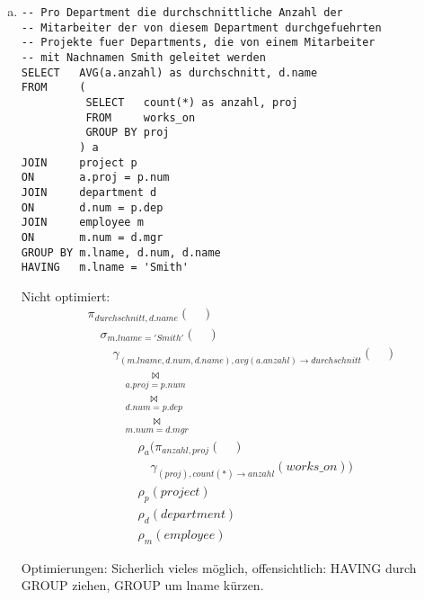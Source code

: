 \begin{normalText}
\begin{enumerate}[a)]
\item

	\begin{lstlisting}
-- Pro Department die durchschnittliche Anzahl der
-- Mitarbeiter der von diesem Department durchgefuehrten
-- Projekte fuer Departments, die von einem Mitarbeiter
-- mit Nachnamen Smith geleitet werden
SELECT   AVG(a.anzahl) as durchschnitt, d.name
FROM     (
          SELECT   count(*) as anzahl, proj
          FROM     works_on
          GROUP BY proj
         ) a
JOIN     project p
ON       a.proj = p.num
JOIN     department d
ON       d.num = p.dep
JOIN     employee m
ON       m.num = d.mgr
GROUP BY m.lname, d.num, d.name
HAVING   m.lname = 'Smith'
	\end{lstlisting}

\begin{note}
	Nicht optimiert:
	\begin{equation*}
\begin{split}
	 & \pi_{durchschnitt, d.name}( \quad )                                                     \\
	 & \quad \sigma_{m.lname = 'Smith'}(\quad)                                                 \\
	 & \qquad \gamma_{(m.lname, d.num, d.name), avg(a.anzahl) \rightarrow durchschnitt}(\quad) \\
	 & \qquad\quad \underset{a.proj = p.num}{\bowtie}                                          \\
	 & \qquad \quad  \underset{d.num = p.dep}{\bowtie}                                         \\
	 & \qquad \quad \underset{m.num = d.mgr}{\bowtie}                                          \\
	 & \qquad\qquad \rho_{a}(\pi_{anzahl, proj}(\quad )                                        \\
	 & \qquad\qquad\quad\gamma_{(proj), count(*) \rightarrow anzahl}(works\_on))               \\
	 & \qquad\qquad \rho_{p}(project)                                                          \\
	 & \qquad\qquad \rho_{d}(department)                                                       \\
	 & \qquad\qquad \rho_{m}(employee)
\end{split}
\end{equation*}

Optimierungen: Sicherlich vieles möglich, offensichtlich: HAVING durch GROUP ziehen, GROUP um lname kürzen.
\end{note}
\end{enumerate}
\end{normalText}
